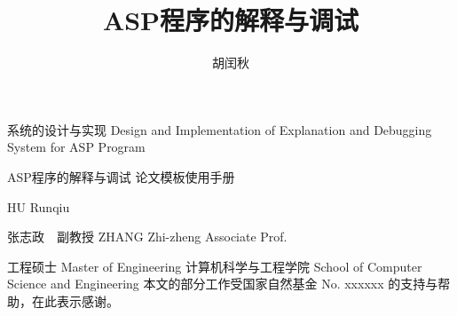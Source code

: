 \documentclass[algorithmlist,figurelist,tablelist,nomlist]{seumasterthesis}
\begin{document}

\title
    {ASP程序的解释与调试}                                      %
    {系统的设计与实现}                                          %
    {Design and Implementation of}  %
    {Explanation and Debugging System for ASP Program}            %

\spine
    {ASP程序的解释与调试  论文模板使用手册}      %
    {}                                                          %

\author
    {胡闰秋}                        %
    {HU Runqiu}                 %

\advisor
    {张志政\ \ 副教授}                       %
    {ZHANG Zhi-zheng}           %
    {Associate Prof.}                     %


\degreetype                     %
    {工程硕士}
    {Master of Engineering}
\submajor{}               %
\department                     %
    {计算机科学与工程学院}
    {School of Computer Science and Engineering}
\seuthesisthanks                %
    {本文的部分工作受国家自然基金 No. xxxxxx 的支持与帮助，在此表示感谢。}
\end{document}
